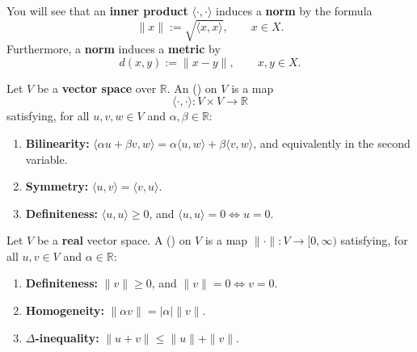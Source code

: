 You will see that an \textbf{inner product} $\langle\cdot,\cdot\rangle$ induces a \textbf{norm}
by the formula
\[\|x\| := \sqrt{\langle x, x\rangle}, \qquad x \in X.\]
Furthermore, a \textbf{norm} induces a \textbf{metric} by
\[d(x,y) := \|x - y\|, \qquad x, y \in X.\]

\begin{definition}
\label{def:inner_product}
Let $V$ be a \textbf{vector space} over $\mathbb{R}$. An 
() on $V$ is a map
\[
\langle\cdot,\cdot\rangle : V \times V \to \mathbb{R}
\]
satisfying, for all $u, v, w \in V$ and $\alpha, \beta \in \mathbb{R}$:
\begin{enumerate}[label=\textbf{(\alph*)}]
  \item \textbf{Bilinearity:}
    $\langle \alpha u + \beta v, w\rangle = \alpha\langle u,w\rangle + \beta\langle v,w\rangle$,
    and equivalently in the second variable.
  \item \textbf{Symmetry:} $\langle u,v\rangle = \langle v,u\rangle$.
  \item \textbf{Definiteness:} $\langle u,u\rangle \geq 0$, and $\langle u,u\rangle = 0 \iff u = 0$.
\end{enumerate}
\end{definition}

\begin{definition}[Norm]
\label{def:norm}
Let $V$ be a \textbf{real} vector space. A  () on $V$ is a map
$\|\cdot\| : V \to [0,\infty)$ satisfying, for all $u, v \in V$ and $\alpha \in \mathbb{R}$:
\begin{enumerate}[label=\textbf{(\alph*)}]
  \item \textbf{Definiteness:} $\|v\| \geq 0$, and $\|v\| = 0 \iff v = 0$.
  \item \textbf{Homogeneity:} $\|\alpha v\| = |\alpha|\|v\|$.
  \item \textbf{$\Delta$-inequality:} $\|u+v\| \leq \|u\| + \|v\|$.
\end{enumerate}
\end{definition}

